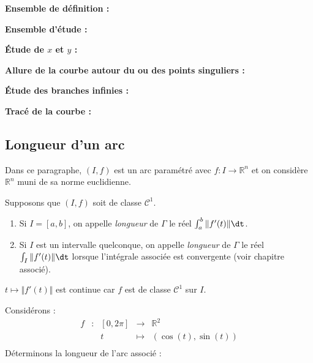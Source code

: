 \documentclass[a4paper,10pt]{report}
\begin{document}
\textbf{Ensemble de définition :}

\vspace{1cm}

\textbf{Ensemble d'étude :}

\vspace{2cm}

\newpage
\textbf{Étude de $x$ et $y$ :}

\vspace{12cm}


\textbf{Allure de la courbe autour du ou des points singuliers : }

\vspace{6cm}

\textbf{Étude des branches infinies :}

\vspace{7cm}

\newpage
\textbf{Tracé de la courbe :}

\vspace{6cm}



\subsection{Longueur d'un arc}
Dans ce paragraphe, $(I,f)$ est un arc paramétré avec $f : I \rightarrow \mathbb{R}^n$ et on considère $\mathbb{R}^n$ muni de sa norme euclidienne.

\begin{Definition}{} Supposons que $(I,f)$ soit de classe $\mathcal{C}^1$. 

\begin{enumerate}
\item Si $I=[a,b]$, on appelle \emph{longueur} de $\Gamma$ le réel $\int_{a}^b \Vert f'(t) \Vert \dt$.
\item Si $I$ est un intervalle quelconque, on appelle \emph{longueur} de $\Gamma$ le réel $\int_{I} \Vert f'(t) \Vert \dt$ lorsque l'intégrale associée est convergente (voir chapitre associé).
\end{enumerate}
\end{Definition}

\begin{Remarque}{} $t \mapsto \Vert f'(t) \Vert$ est continue car $f$ est de classe $\mathcal{C}^1$ sur $I$.
\end{Remarque}


\begin{Exemple} Considérons : $$ \begin{array}{ccccl}
f & : & [0,2 \pi] & \rightarrow & \mathbb{R}^2 \\
 & & t & \mapsto & (\cos(t), \sin(t)) \\
\end{array}$$
Déterminons la longueur de l'arc associé :

\vspace{4cm}
\end{Exemple}
\end{document}
